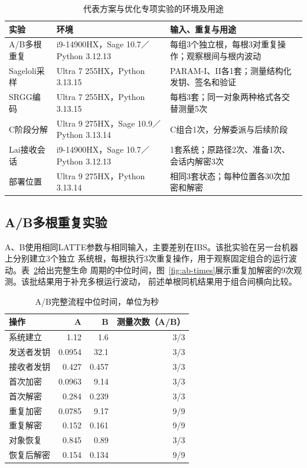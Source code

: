 \begin{table}[H]
\centering\small
\caption{代表方案与优化专项实验的环境及用途}
\label{tab:specialized-environments}
\begin{tabularx}{\textwidth}{@{}>{\raggedright\arraybackslash}p{}>{\raggedright\arraybackslash}p{}>{\raggedright\arraybackslash}X@{}}
\toprule
\rowcolor{black!8} 实验 & 环境 & 输入、重复与用途 \\
\midrule
A/B多根重复 & i9-14900HX，Sage 10.7／Python 3.12.13 & 每组3个独立根，每根3对重复操作；观察根间与根内波动 \\
Sageloli采样 & Ultra 7 255HX，Python 3.13.15 & PARAM-I、II各1套；测量结构化发钥、签名和验证 \\
SRGG编码 & Ultra 7 255HX，Python 3.13.15 & 每档3套；同一对象两种格式各交替测量5次 \\
C阶段分解 & Ultra 9 275HX，Sage 10.9／Python 3.13.14 & C组合1次，分解委派与后续阶段 \\
Lai接收会话 & i9-14900HX，Sage 10.7／Python 3.12.13 & 1套系统；原路径2次、准备1次、会话内解密3次 \\
部署位置 & Ultra 9 275HX，Python 3.13.14 & 相同3套状态；每种位置各30次加密和解密 \\
\bottomrule
\end{tabularx}
\end{table}

\subsection{A/B多根重复实验}
A、B使用相同LATTE参数与相同输入，主要差别在IBS。该批实验在另一台机器上分别建立3个独立
系统根，每根执行3次重复操作，用于观察固定组合的运行波动。表~\ref{tab:ab-times}给出完整生命
周期的中位时间，图~\ref{fig:ab-times}展示重复加解密的9次观测。该批结果用于补充多根运行波动，
前述单根同机结果用于组合间横向比较。

\begin{table}[H]
\centering\small
\caption{A/B完整流程中位时间，单位为秒}
\label{tab:ab-times}
\begin{tabular}{@{}lrrr@{}}
\toprule
\rowcolor{black!8} 操作 & A & B & 测量次数（A/B） \\
\midrule
系统建立 & 1.12 & 1.6 & 3/3 \\
发送者发钥 & 0.0954 & 32.1 & 3/3 \\
接收者发钥 & 0.427 & 0.457 & 3/3 \\
首次加密 & 0.0963 & 9.14 & 3/3 \\
首次解密 & 0.284 & 0.239 & 3/3 \\
重复加密 & 0.0785 & 9.17 & 9/9 \\
重复解密 & 0.152 & 0.161 & 9/9 \\
对象恢复 & 0.845 & 0.89 & 3/3 \\
恢复后解密 & 0.154 & 0.134 & 9/9 \\
\bottomrule
\end{tabular}
\end{table}

